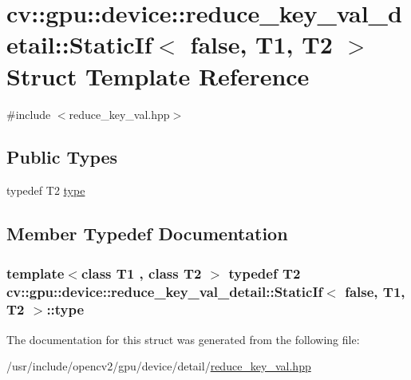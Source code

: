 \hypertarget{structcv_1_1gpu_1_1device_1_1reduce__key__val__detail_1_1StaticIf_3_01false_00_01T1_00_01T2_01_4}{\section{cv\-:\-:gpu\-:\-:device\-:\-:reduce\-\_\-key\-\_\-val\-\_\-detail\-:\-:Static\-If$<$ false, T1, T2 $>$ Struct Template Reference}
\label{structcv_1_1gpu_1_1device_1_1reduce__key__val__detail_1_1StaticIf_3_01false_00_01T1_00_01T2_01_4}
}


{\ttfamily \#include $<$reduce\-\_\-key\-\_\-val.\-hpp$>$}

\subsection*{Public Types}
\begin{DoxyCompactItemize}
\item 
typedef T2 \hyperlink{structcv_1_1gpu_1_1device_1_1reduce__key__val__detail_1_1StaticIf_3_01false_00_01T1_00_01T2_01_4_aca414e4335d9918594f7625c3aeeae87}{type}
\end{DoxyCompactItemize}


\subsection{Member Typedef Documentation}
\hypertarget{structcv_1_1gpu_1_1device_1_1reduce__key__val__detail_1_1StaticIf_3_01false_00_01T1_00_01T2_01_4_aca414e4335d9918594f7625c3aeeae87}{
\subsubsection[{type}]{\setlength{\rightskip}{0pt plus 5cm}template$<$class T1 , class T2 $>$ typedef T2 {\bf cv\-::gpu\-::device\-::reduce\-\_\-key\-\_\-val\-\_\-detail\-::\-Static\-If}$<$ {\bf false}, T1, T2 $>$\-::{\bf type}}}\label{structcv_1_1gpu_1_1device_1_1reduce__key__val__detail_1_1StaticIf_3_01false_00_01T1_00_01T2_01_4_aca414e4335d9918594f7625c3aeeae87}


The documentation for this struct was generated from the following file\-:\begin{DoxyCompactItemize}
\item 
/usr/include/opencv2/gpu/device/detail/\hyperlink{reduce__key__val_8hpp}{reduce\-\_\-key\-\_\-val.\-hpp}\end{DoxyCompactItemize}
